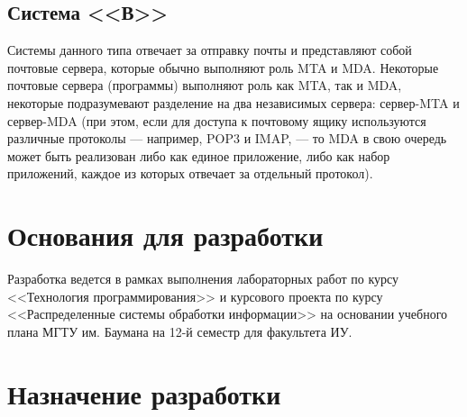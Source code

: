 \subsection{Система <<В>>}
 Системы данного типа отвечает за отправку почты и представляют собой почтовые сервера, которые обычно выполняют роль MTA и MDA. Некоторые почтовые сервера (программы) выполняют роль как MTA, так и MDA, некоторые подразумевают разделение на два независимых сервера: сервер-MTA и сервер-MDA (при этом, если для доступа к почтовому ящику используются различные протоколы — например, POP3 и IMAP, — то MDA в свою очередь может быть реализован либо как единое приложение, либо как набор приложений, каждое из которых отвечает за отдельный протокол).

\section{Основания для разработки}
Разработка ведется в рамках выполнения лабораторных работ по курсу <<Технология программирования>> и курсового проекта по курсу <<Распределенные системы обработки информации>> на основании учебного плана МГТУ им. Баумана на 12-й семестр для факультета ИУ.

\section{Назначение разработки}
